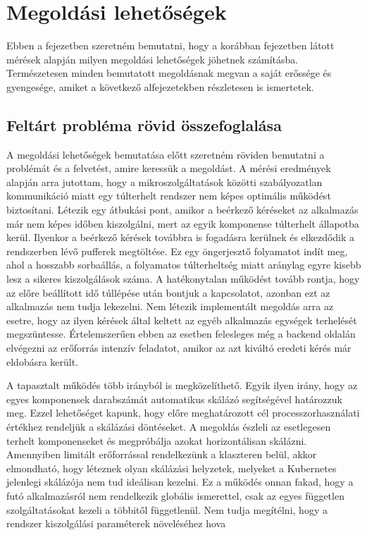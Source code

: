 \chapter{Megoldási lehetőségek}
\label{sec:solutions}

Ebben a fejezetben szeretném bemutatni, hogy a korábban  fejezetben látott mérések alapján milyen megoldási lehetőségek jöhetnek számításba.
Természetesen minden bemutatott megoldásnak megvan a saját erőssége és gyengesége, amiket a következő alfejezetekben részletesen is ismertetek.

\section{Feltárt probléma rövid összefoglalása}

A megoldási lehetőségek bemutatása előtt szeretném röviden bemutatni a problémát és a felvetést, amire keressük a megoldást.
A mérési eredmények alapján arra jutottam, hogy a mikroszolgáltatások közötti szabályozatlan kommunikáció miatt egy túlterhelt rendszer nem képes optimális működést biztosítani.
Létezik egy átbukási pont, amikor a beérkező kéréseket az alkalmazás már nem képes időben kiszolgálni, mert az egyik komponense túlterhelt állapotba kerül.
Ilyenkor a beérkező kérések továbbra is fogadásra kerülnek és elkezdődik a rendszerben lévő pufferek megtöltése.
Ez egy öngerjesztő folyamatot indít meg, ahol a hosszabb sorbaállás, a folyamatos túlterheltség miatt aránylag egyre kisebb lesz a sikeres kiszolgálások száma.
A hatékonytalan működést tovább rontja, hogy az előre beállított idő túllépése után bontjuk a kapcsolatot, azonban ezt az alkalmazás nem tudja lekezelni.
Nem létezik implementált megoldás arra az esetre, hogy az ilyen kérések által keltett az egyéb alkalmazás egységek terhelését megszüntesse.
Értelemszerűen ebben az esetben felesleges még a backend oldalán elvégezni az erőforrás intenzív feladatot, amikor az azt kiváltó eredeti kérés már eldobásra került.

A tapasztalt működés több irányból is megközelíthető.
Egyik ilyen irány, hogy az egyes komponensek darabszámát automatikus skálázó segítségével határozzuk meg.
Ezzel lehetőséget kapunk, hogy előre meghatározott cél processzorhasználati értékhez rendeljük a skálázási döntéseket. 
A megoldás észleli az esetlegesen terhelt komponenseket és megpróbálja azokat horizontálisan skálázni.
Amennyiben limitált erőforrással rendelkezünk a klaszteren belül, akkor elmondható, hogy léteznek olyan skálázási helyzetek, melyeket a Kubernetes jelenlegi skálázója nem tud ideálisan kezelni.
Ez a működés onnan fakad, hogy a futó alkalmazásról nem rendelkezik globális ismerettel, csak az egyes független szolgáltatásokat kezeli a többitől függetlenül.
Nem tudja megítélni, hogy a rendszer kiszolgálási paraméterek növeléséhez hova 

